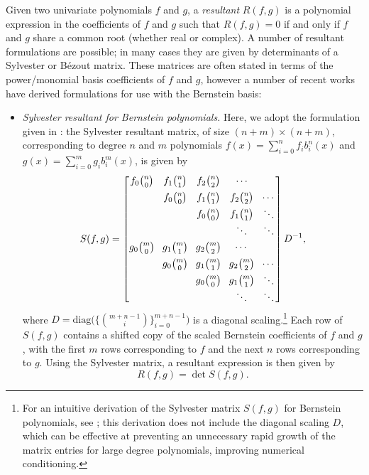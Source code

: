 \documentclass[onefignum,onetabnum,onealgnum,oneeqnum]{siamart190516}
\newcommand{\diagdots}{\raisebox{-0.2em}{$\ddots$}}
\begin{document}
Given two univariate polynomials $f$ and $g$, a \textit{resultant} $R(f,g)$ is a polynomial expression in the coefficients of $f$ and $g$ such that $R(f,g) = 0$ if and only if $f$ and $g$ share a common root (whether real or complex). A number of resultant formulations are possible; in many cases they are given by determinants of a Sylvester or B\'ezout matrix. These matrices are often stated in terms of the power/monomial basis coefficients of $f$ and $g$, however a number of recent works \cite{WINKLER2000179,WINKLER2003153,BINI2004319,WINKLER2008529} have derived formulations for use with the Bernstein basis:
\begin{itemize}
\item \textit{Sylvester resultant for Bernstein polynomials.} Here, we adopt the formulation given in \cite{WINKLER2008529}: the Sylvester resultant matrix, of size $(n + m) \times (n + m)$, corresponding to degree $n$ and $m$ polynomials $f(x) = \sum_{i=0}^n f_i b_i^n(x)$ and $g(x) = \sum_{i=0}^m g_i b_i^m(x)$, is given by
\[ S(f,g) = \begingroup %
\setlength\arraycolsep{4pt} \begin{bmatrix}
 f_0 \binom{n}{0} & f_1 \binom{n}{1} & f_2 \binom{n}{2} & \cdots \\
                  & f_0 \binom{n}{0} & f_1 \binom{n}{1} & f_2 \binom{n}{2} & \cdots\vphantom{\diagdots} \\
									&                  & f_0 \binom{n}{0} & f_1 \binom{n}{1} & \diagdots  \\
									& & & \diagdots & \diagdots \\
 g_0 \binom{m}{0} & g_1 \binom{m}{1} & g_2 \binom{m}{2} & \cdots\vphantom{\diagdots} \\
                  & g_0 \binom{m}{0} & g_1 \binom{m}{1} & g_2 \binom{m}{2} & \cdots\vphantom{\diagdots} \\
									&                  & g_0 \binom{m}{0} & g_1 \binom{m}{1} & \diagdots  \\
									& & & \diagdots & \diagdots 
\end{bmatrix} D^{-1}, \endgroup
 \]
where $D = \text{diag}\bigl( \{\binom{m+n-1}{i}\}_{i=0}^{m+n-1} \bigr)$ is a diagonal scaling.\footnote{For an intuitive derivation of the Sylvester matrix $S(f,g)$ for Bernstein polynomials, see \cite{FAROUKI19881}; this derivation does not include the diagonal scaling $D$, which can be effective at preventing an unnecessary rapid growth of the matrix entries for large degree polynomials, improving numerical conditioning.} Each row of $S(f,g)$ contains a shifted copy of the scaled Bernstein coefficients of $f$ and $g$, with the first $m$ rows corresponding to $f$ and the next $n$ rows corresponding to $g$. %
Using the Sylvester matrix, a resultant expression is then given by
\[ R(f,g) = \det S(f,g). \]


\end{itemize}
\end{document}
